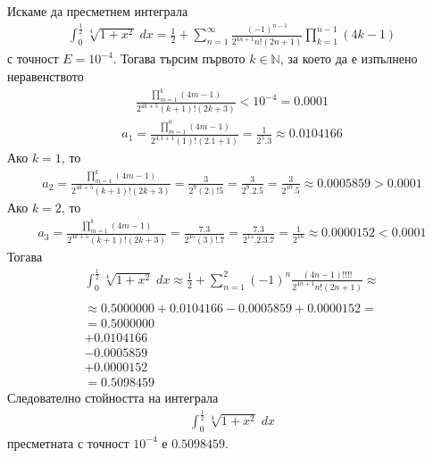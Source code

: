 \documentclass[a4paper,14pt]{extarticle}
\newcommand{\N}{\mathbb{N}}
\begin{document}
Искаме да пресметнем интеграла \begin{align*}
    \displaystyle\int_0^{\frac{1}{2}} \sqrt[4]{1 + x^2} \; dx = \frac{1}{2} + \displaystyle\sum_{n = 1}^{\infty} \frac{(-1)^{n - 1}}{2^{4n + 1} n! (2n + 1)}\displaystyle\prod_{k = 1}^{n - 1}(4k - 1)
\end{align*} с точност $E = 10^{-4}$. Тогава търсим първото $k \in \N$,
за което да е изпълнено неравенството
\begin{align*}
    \displaystyle\frac{\displaystyle\prod_{m = 1}^{k}(4m - 1)}{2^{4k + 5}(k + 1)!(2k + 3)} < 10^{-4} = 0.0001
\end{align*}
\begin{align*}
    a_1 = \displaystyle\frac{\displaystyle\prod_{m = 1}^{0}(4m - 1)}{2^{4.1 + 1}(1)!(2.1 + 1)} = \frac{1}{2^{5}.3} \approx 0.0104166 
\end{align*}
Ако $k = 1$, то \begin{align*}
    a_2 = \displaystyle\frac{\displaystyle\prod_{m = 1}^{k}(4m - 1)}{2^{4k + 5}(k + 1)!(2k + 3)} = \frac{3}{2^{9}(2)!5} = \frac{3}{2^{9}.2.5} = \frac{3}{2^{10}.5} \approx 0.0005859 > 0.0001 
\end{align*}
Ако $k = 2$, то \begin{align*}
    a_3 = \displaystyle\frac{\displaystyle\prod_{m = 1}^{k}(4m - 1)}{2^{4k + 5}(k + 1)!(2k + 3)} = \frac{7.3}{2^{15}(3)!.7} = \frac{7.3}{2^{15}.2.3.7} = \frac{1}{2^{16}} \approx 0.0000152 < 0.0001 
\end{align*}
Тогава \begin{align*}
    \displaystyle\int_0^{\frac{1}{2}} \sqrt[4]{1 + x^2} \; dx \approx \frac{1}{2} + \displaystyle\sum_{n = 1}^{2} (-1)^{n}\frac{(4n - 1)!!!!}{2^{4n + 1}n!(2n + 1)} \approx \\\\
    \approx 0.5000000 + 0.0104166 - 0.0005859 + 0.0000152 = \\
    = 0.5000000 \\
    + 0.0104166 \\
    - 0.0005859 \\
    + 0.0000152 \\
    = 0.5098459
\end{align*}
Следователно стойността на интеграла \begin{align*}
    \displaystyle\int_0^{\frac{1}{2}} \sqrt[4]{1 + x^2} \; dx
\end{align*} пресметната с точност $10^{-4}$ е $0.5098459$.
\end{document}
